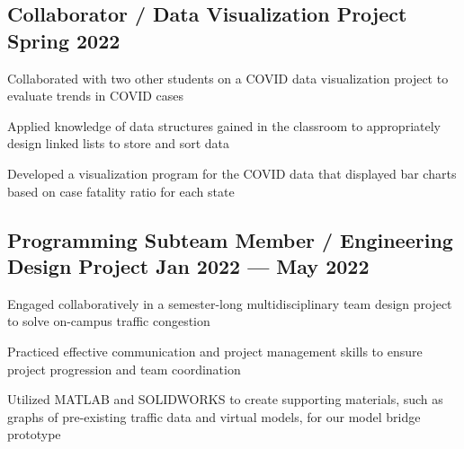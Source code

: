 \subsection{{Collaborator / Data Visualization Project \hfill Spring 2022}}
\begin{zitemize}
\item Collaborated with two other students on a COVID data visualization project to evaluate trends in COVID cases
\item Applied knowledge of data structures gained in the classroom to appropriately design linked lists to store and sort data
\item Developed a visualization program for the COVID data that displayed bar charts based on case fatality ratio for each state

\end{zitemize}

\subsection{{Programming Subteam Member / Engineering Design Project \hfill Jan 2022 --- May 2022}}
\begin{zitemize}
\item Engaged collaboratively in a semester-long multidisciplinary team design project to solve on-campus traffic congestion
\item Practiced effective communication and project management skills to ensure project progression and team coordination
\item Utilized MATLAB and SOLIDWORKS to create supporting materials, such as graphs of pre-existing traffic data and virtual models, for our model bridge prototype

\end{zitemize}

